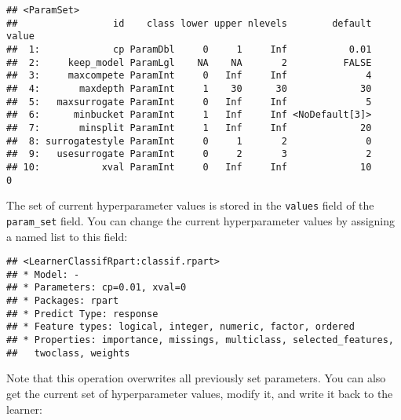\documentclass[
]{scrbook}
\newenvironment{Shaded}{\begin{snugshade}}{\end{snugshade}}
\newcommand{\AttributeTok}[1]{\textcolor[rgb]{0.77,0.63,0.00}{#1}}
\newcommand{\DecValTok}[1]{\textcolor[rgb]{0.00,0.00,0.81}{#1}}
\newcommand{\FloatTok}[1]{\textcolor[rgb]{0.00,0.00,0.81}{#1}}
\newcommand{\FunctionTok}[1]{\textcolor[rgb]{0.00,0.00,0.00}{#1}}
\newcommand{\NormalTok}[1]{#1}
\newcommand{\OtherTok}[1]{\textcolor[rgb]{0.56,0.35,0.01}{#1}}
\newcommand{\SpecialCharTok}[1]{\textcolor[rgb]{0.00,0.00,0.00}{#1}}
\renewenvironment{Shaded} {\begin{snugshade}\small} {\end{snugshade}}
\begin{document}
\begin{Shaded}
\end{Shaded}

\begin{verbatim}
## <ParamSet>
##                 id    class lower upper nlevels        default value
##  1:             cp ParamDbl     0     1     Inf           0.01      
##  2:     keep_model ParamLgl    NA    NA       2          FALSE      
##  3:     maxcompete ParamInt     0   Inf     Inf              4      
##  4:       maxdepth ParamInt     1    30      30             30      
##  5:   maxsurrogate ParamInt     0   Inf     Inf              5      
##  6:      minbucket ParamInt     1   Inf     Inf <NoDefault[3]>      
##  7:       minsplit ParamInt     1   Inf     Inf             20      
##  8: surrogatestyle ParamInt     0     1       2              0      
##  9:   usesurrogate ParamInt     0     2       3              2      
## 10:           xval ParamInt     0   Inf     Inf             10     0
\end{verbatim}

The set of current hyperparameter values is stored in the \texttt{values} field of the \texttt{param\_set} field.
You can change the current hyperparameter values by assigning a named list to this field:

\begin{Shaded}
\end{Shaded}

\begin{verbatim}
## <LearnerClassifRpart:classif.rpart>
## * Model: -
## * Parameters: cp=0.01, xval=0
## * Packages: rpart
## * Predict Type: response
## * Feature types: logical, integer, numeric, factor, ordered
## * Properties: importance, missings, multiclass, selected_features,
##   twoclass, weights
\end{verbatim}

Note that this operation overwrites all previously set parameters.
You can also get the current set of hyperparameter values, modify it, and write it back to the learner:
\end{document}
